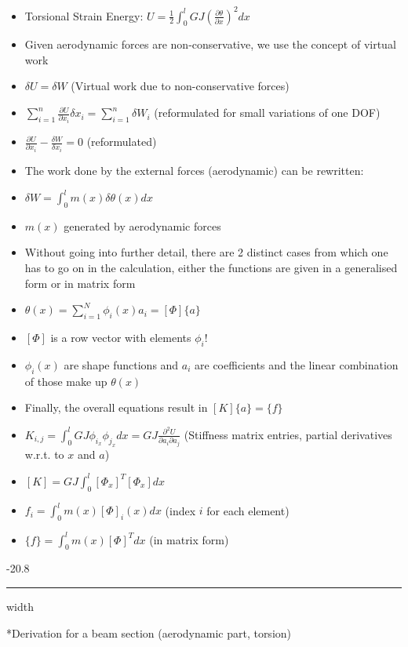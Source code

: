 \documentclass[8pt, landscape, fleqn]{scrartcl}
\makeatletter
\renewcommand{\subsubsection}{\@startsection{subsubsection}{1}{0mm}%
{-2\baselineskip}{0.8\baselineskip}%
{\hrule depth 0.2pt width\columnwidth\vspace*{1.2em}\normalsize\bfseries\rmfamily}}
\makeatother
\begin{document}
\begin{multicols*}{3}
\begin{itemize}
    \item Torsional Strain Energy: $U = \frac{1}{2}\int_0^l GJ (\frac{\partial \theta}{\partial x})^2 dx$
    \item Given aerodynamic forces are non-conservative, we use the concept of virtual work
    \item $\delta U = \delta W$ (Virtual work due to non-conservative forces)
    \item $\sum_{i=1}^n \frac{\partial U}{\partial x_i} \delta x_i = \sum_{i=1}^n \delta W_i$ (reformulated for small variations of one DOF)
    \item $\frac{\partial U}{\partial x_i} - \frac{\delta W}{\delta x_i} = 0$ (reformulated)
    \item The work done by the external forces (aerodynamic) can be rewritten:
    \item $\delta W = \int_0^l m(x) \delta \theta(x) dx$ 
    \item $m(x)$ generated by aerodynamic forces
    \item Without going into further detail, there are 2 distinct cases from which one has to go on in the calculation, either the functions are given in a generalised form or in matrix form
    \item $\theta(x) = \sum_{i=1}^N \phi_i(x)a_i = [\Phi] \{a\}$
    \item $[\Phi]$ is a row vector with elements $\phi_i$!
    \item $\phi_i(x)$ are shape functions and $a_i$ are coefficients and the linear combination of those make up $\theta(x)$
    \item Finally, the overall equations result in $[K] \{a\} = \{f\}$ 
    \item $K_{i,j} = \int_0^l GJ \phi_{i_x} \phi_{j_x} dx = GJ \frac{\partial^2 U}{\partial a_i \partial a_j}$ (Stiffness matrix entries, partial derivatives w.r.t. to $x$ and $a$)
    \item $[K] = GJ \int_0^l [\Phi_x]^T[\Phi_x] dx$
    \item $f_i = \int_0^l m(x) [\Phi]_i(x) dx$ (index $i$ for each element)
    \item $\{f\} = \int_0^l m(x) [\Phi]^T dx$ (in matrix form)
\end{itemize}

\subsubsection*{Derivation for a beam section (aerodynamic part, torsion)} 


\end{multicols*}
\end{document}
